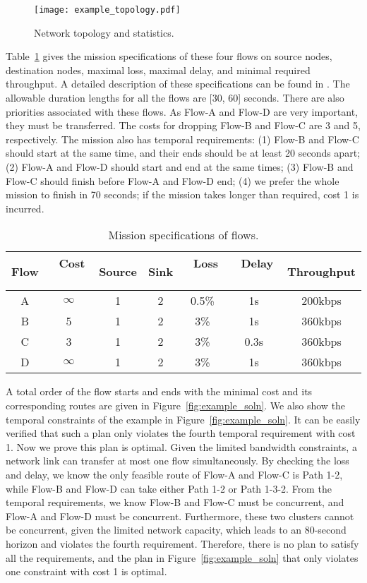\documentclass[letterpaper]{article} %
\theoremstyle{definition}
\begin{document}
\begin{figure}[ht]
\centering
\texttt{[image: example\_topology.pdf]}
{\caption{Network topology and statistics.}
\label{fig:example_topology}}
\end{figure}


Table~\ref{tab:example_flow} gives the mission specifications of these four flows on source nodes, destination nodes, maximal loss, maximal delay, and minimal required throughput. A detailed description of these specifications can be found in \cite{chen2018radmax}. The allowable duration lengths for all the flows are [30, 60] seconds. There are also priorities associated with these flows. As Flow-A and Flow-D are very important, they must be transferred. The costs for dropping Flow-B and Flow-C are 3 and 5, respectively. The mission also has temporal requirements: (1) Flow-B and Flow-C should start at the same time, and their ends should be at least 20 seconds apart; (2) Flow-A and Flow-D should start and end at the same times; (3) Flow-B and Flow-C should finish before Flow-A and Flow-D end; (4) we prefer the whole mission to finish in 70 seconds; if the mission takes longer than required, cost 1 is incurred. 

\begin{table}[ht]
\scriptsize
\centering
\begin{tabular}{|c||c|c|c|c|c|c|}
 \hline
 Flow & \ Cost \ & Source & Sink & \  Loss \ & \ Delay \ & Throughput \\
 \hline
 A & $\infty$ & 1 & 2 & 0.5\% & 1s & 200kbps \\  \hline
 B & 5 & 1 & 2 & 3\% & 1s & 360kbps \\  \hline
 C & 3 & 1 & 2 & 3\% & 0.3s & 360kbps \\  \hline
 D & $\infty$ & 1 & 2 & 3\% & 1s & 360kbps \\  \hline
\end{tabular}
{\caption{Mission specifications of flows.}
\label{tab:example_flow}}
\end{table}


A total order of the flow starts and ends with the minimal cost and its corresponding routes are given in Figure~\ref{fig:example_soln}. We also show the temporal constraints of the example in Figure~\ref{fig:example_soln}. It can be easily verified that such a plan only violates the fourth temporal requirement with cost 1. Now we prove this plan is optimal. Given the limited bandwidth constraints, a network link can transfer at most one flow simultaneously. By checking the loss and delay, we know the only feasible route of Flow-A and Flow-C is Path 1-2, while Flow-B and Flow-D can take either Path 1-2 or Path 1-3-2. From the temporal requirements, we know Flow-B and Flow-C must be concurrent, and Flow-A and Flow-D must be concurrent. Furthermore, these two clusters cannot be concurrent, given the limited network capacity, which leads to an 80-second horizon and violates the fourth requirement. Therefore, there is no plan to satisfy all the requirements, and the plan in Figure~\ref{fig:example_soln} that only violates one constraint with cost 1 is optimal.
\end{document}
